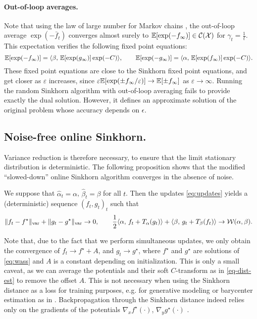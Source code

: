 \paragraph{Out-of-loop averages.} Note that using the law of large number for Markov chains
\citep{breiman_strong_1960}, the out-of-loop average $\exp(-\bar f_t)$
converges almost surely to $\mathbb{E}[\exp(-f_\infty)]
 \in \mathcal{C}(\mathcal{X})$ for $\gamma_t = 
 \frac{1}{t}$. This expectation verifies the following fixed point equations:
\begin{equation}
    \mathbb{E}[\exp(-f_\infty)] =
     \langle \beta,\,\mathbb{E}[\exp(g_\infty)] \exp(-C)\rangle,\qquad
    \mathbb{E}[\exp(-g_\infty)] =
     \langle \alpha,\,\mathbb{E}[\exp(f_\infty)] \exp(-C)\rangle.
\end{equation}
These fixed point equations are close to the Sinkhorn fixed point equations, and
get closer as $\varepsilon$ increases, since $\varepsilon \mathbb{E}[\exp(\pm f_\infty /
\varepsilon)] \to \mathbb{E}[\pm f_\infty]$ as $\varepsilon \to \infty$. Running the random
Sinkhorn algorithm with out-of-loop averaging fails to provide exactly the dual solution.
However, it defines an approximate solution of the original problem whose accuracy depends on $\epsilon$. 
%

\subsection{Noise-free online Sinkhorn.}

Variance reduction is therefore necessary, to ensure that the limit stationary
distribution is deterministic. The following proposition shows that the modified ``slowed-down'' online Sinkhorn algorithm converges in the absence of noise.

\begin{proposition}\label{eq:deterministic}
    We suppose that $\hat \alpha_t = \alpha$, $\hat \beta_t = \beta$ for all
    $t$. Then the updates \eqref{eq:updates} yields a (deterministic) sequence $(f_t, g_t)_t$ such
    that 
    \begin{equation}
        \Vert f_t - f^\star \Vert_{\text{var}} 
        + \Vert g_t - g^\star \Vert_{\text{var}} \to 0,\qquad
        \frac{1}{2} \langle \alpha,\,f_t + T_{\alpha}(g_t)\rangle + \langle \beta,\,g_t + T_{\beta}(f_t)\rangle 
         \to \mathcal{W}(\alpha, \beta).
    \end{equation}
\end{proposition}
Note that, due to the fact that we perform simultaneous updates, we only obtain
the convergence of $f_t \to f^\star + A$, and $g_t \to g^\star$, where $f^\star$
and $g^\star$ are solutions of \eqref{eq:wass} and $A$ is a constant depending
on initialization. This is only a small caveat, as we can average the potentials
and their soft $C$-transform as in \eqref{eq-dist-est} to remove the offset $A$.
This is not necessary when using the Sinkhorn distance as a loss for training
purposes, e.g. for generative modeling or barycenter estimation as in
\citet{staib2017parallel}. Backpropagation through the Sinkhorn distance indeed
relies only on the gradients of the potentials $\nabla_x f^\star(\cdot)$,
$\nabla_y g^\star(\cdot)$ \citep[e.g.][]{cuturi2018semidual}.

